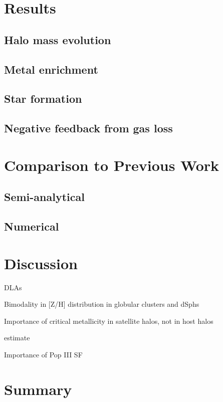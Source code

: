 \documentclass[12pt,preprint]{aastex}
\begin{document}
\section{Results}
\label{sec:results}

\subsection{Halo mass evolution}

\subsection{Metal enrichment}

\subsection{Star formation}

\subsection{Negative feedback from gas loss}

\section{Comparison to Previous Work}

\subsection{Semi-analytical}

\subsection{Numerical}

\section{Discussion}

\li DLAs

\li Bimodality in [Z/H] distribution in globular clusters and dSphs

\li Importance of critical metallicity in satellite halos, not in host
halos

\li [$\alpha$/Fe] estimate

\li Importance of Pop III SF

\section{Summary}
\end{document}
